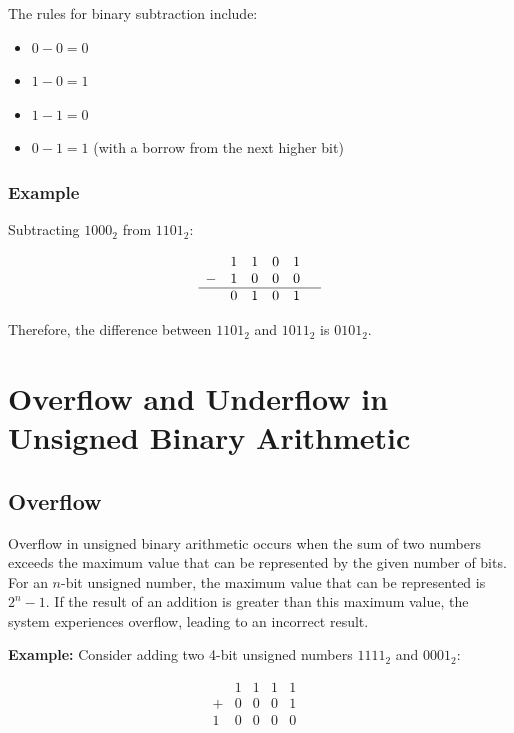 \documentclass[12pt,openany]{book}
\begin{document}
	The rules for binary subtraction include:
	\begin{itemize}
		\item[] \(0 - 0 = 0\)
		\item[] \(1 - 0 = 1\)
		\item[] \(1 - 1 = 0\)
		\item[] \(0 - 1 = 1\) (with a borrow from the next higher bit)
	\end{itemize}
	
	\subsubsection{Example}
	
	Subtracting \(1000_2\) from \(1101_2\):
	
	\[
		\begin{array}{cccccc}
			  & 1 & 1 & 0 & 1 &   \\
			- & 1 & 0 & 0 & 0 &   \\
			\hline
			  & 0 & 1 & 0 & 1 &   \\
		\end{array}
	\]
	
	
	Therefore, the difference between $1101_2$ and $1011_2$ is $0101_2$.
	
	\section{Overflow and Underflow in Unsigned Binary Arithmetic}
	
	\subsection{Overflow}
	
	Overflow in unsigned binary arithmetic occurs when the sum of two numbers exceeds the maximum value that can be represented by the given number of bits. For an \(n\)-bit unsigned number, the maximum value that can be represented is \(2^n - 1\). If the result of an addition is greater than this maximum value, the system experiences overflow, leading to an incorrect result.
	
	\textbf{Example:} Consider adding two 4-bit unsigned numbers \(1111_2\) and \(0001_2\):
	
	\[
		\begin{array}{cccccc}
			  & 1 & 1 & 1 & 1 &   \\
			+ & 0 & 0 & 0 & 1 &   \\
			\hline
			1 & 0 & 0 & 0 & 0 &   \\
		\end{array}
	\]
	
\end{document}
